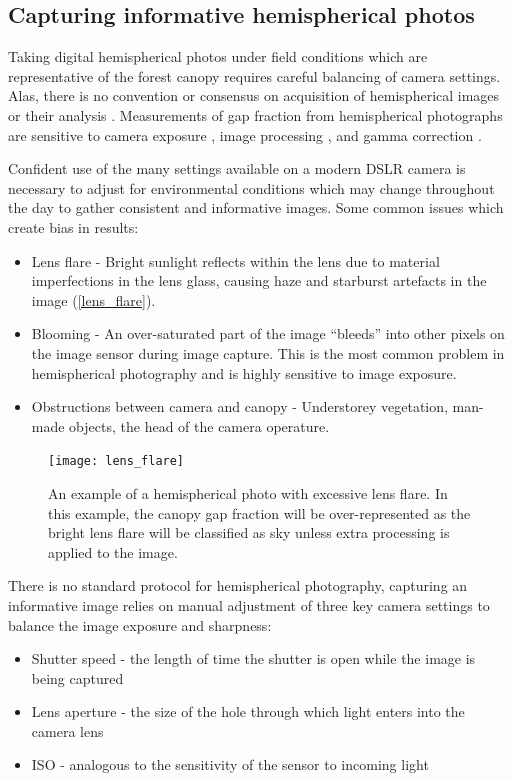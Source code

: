 \documentclass[11pt,a4paper]{article}
\begin{document}
\subsection{Capturing informative hemispherical photos}

Taking digital hemispherical photos under field conditions which are representative of the forest canopy requires careful balancing of camera settings. Alas, there is no convention or consensus on acquisition of hemispherical images or their analysis \citep{Beckschafer2013}. Measurements of gap fraction from hemispherical photographs are sensitive to camera exposure \citep{Macfarlane2000}, image processing \citep{Jonckheere2004}, and gamma correction \citep{Macfarlane2007a}. 

Confident use of the many settings available on a modern DSLR camera is necessary to adjust for environmental conditions which may change throughout the day to gather consistent and informative images. Some common issues which create bias in results:

\begin{itemize}
	\item{Lens flare - Bright sunlight reflects within the lens due to material imperfections in the lens glass, causing haze and starburst artefacts in the image (\autoref{lens_flare}).}
	\item{Blooming - An over-saturated part of the image ``bleeds'' into other pixels on the image sensor during image capture. This is the most common problem in hemispherical photography and is highly sensitive to image exposure.}
	\item{Obstructions between camera and canopy - Understorey vegetation, man-made objects, the head of the camera operature.}
\end{itemize}

\begin{figure}[H]
\centering
	\texttt{[image: lens\_flare]}
	\caption{An example of a hemispherical photo with excessive lens flare. In this example, the canopy gap fraction will be over-represented as the bright lens flare will be classified as sky unless extra processing is applied to the image.}
	\label{lens_flare}
\end{figure}

There is no standard protocol for hemispherical photography, capturing an informative image relies on manual adjustment of three key camera settings to balance the image exposure and sharpness:

\begin{itemize}
	\item{Shutter speed - the length of time the shutter is open while the
		image is being captured}
	\item{Lens aperture - the size of the hole through which light enters into
		the camera lens}
	\item{ISO - analogous to the sensitivity of the sensor to incoming light}
\end{itemize}
\end{document}
